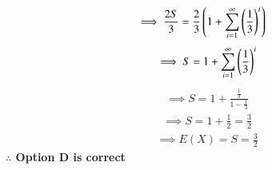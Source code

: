   \begin{align}
     \implies \frac{2S}{3}&=\frac{2}{3}\left(
     1+\sum_{i=1}^{\infty}\left(\frac{1}{3}\right)^{i}\right)
  \end{align}
  \begin{align}
     \implies S=1+\sum_{i=1}^{\infty}\left(\frac{1}{3}\right)^{i}
  \end{align}
  \begin{align}
     \implies S=1+\frac{\frac{1}{3}}{1-\frac{1}{3}}
  \end{align}
  \begin{align}
     \implies S=1+\frac{1}{2}=\frac{3}{2}
  \end{align}
  \begin{align}
     \implies E(X)=S=\frac{3}{2}
  \end{align}
  \textbf{$\therefore$ Option D is correct}    